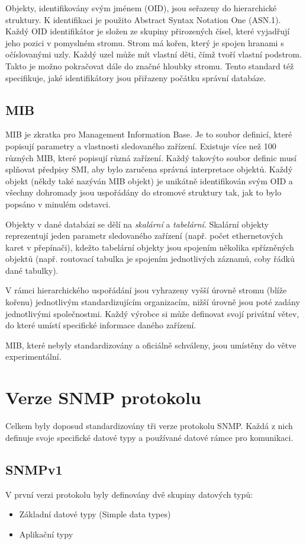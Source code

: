 Objekty, identifikovány svým jménem (OID), jsou seřazeny do hierarchické struktury. K identifikaci je použito Abstract Syntax Notation One (ASN.1). Každý OID identifikátor je složen ze skupiny přirozených čísel, které
vyjadřují jeho pozici v pomyslném stromu. Strom má kořen, který je spojen hranami s očíslovanými uzly. Každý uzel může mít vlastní děti, čímž tvoří vlastní podstrom. Takto je možno pokračovat dále do značné hloubky stromu. 
Tento standard též specifikuje, jaké identifikátory jsou přiřazeny počátku správní databáze.

\subsection*{MIB}
MIB je zkratka pro Management Information Base. Je to soubor definicí, které popisují parametry a vlastnosti sledovaného zařízení. Existuje více než 100 různých MIB, které popisují různá zařízení. Každý takovýto
soubor definic musí splňovat předpisy SMI, aby bylo zaručena správná interpretace objektů. Každý objekt (někdy také nazýván MIB objekt) je unikátně identifikován svým OID a všechny dohromady jsou uspořádány do
stromové struktury tak, jak to bylo popsáno v minulém odstavci. 

Objekty v dané databázi se dělí na \textit{skalární} a \textit{tabelární}. Skalární objekty reprezentují jeden parametr sledovaného zařízení (např. počet ethernetových karet v přepínači), kdežto tabelární objekty
jsou spojením několika spřízněných objektů (např. routovací tabulka je spojením jednotlivých záznamů, coby řádků dané tabulky).

V rámci hierarchického uspořádání jsou vyhrazeny vyšší úrovně stromu (blíže kořenu) jednotlivým standardizujícím organizacím, nižší úrovně jsou poté zadány jednotlivými společnostmi. Každý výrobce si může definovat svojí
privátní větev, do které umístí specifické informace daného zařízení.

MIB, které nebyly standardizovány a oficiálně schváleny, jsou umístěny do větve experimentální.


\section{Verze SNMP protokolu}
Celkem byly doposud standardizovány tři verze protokolu SNMP. Každá z nich definuje svoje specifické datové typy a používané datové rámce pro komunikaci. 

\subsection*{SNMPv1}
V první verzi protokolu byly definovány dvě skupiny datových typů:
\begin{itemize}
	\item Základní datové typy (Simple data types)
	\item Aplikační typy
\end{itemize}

